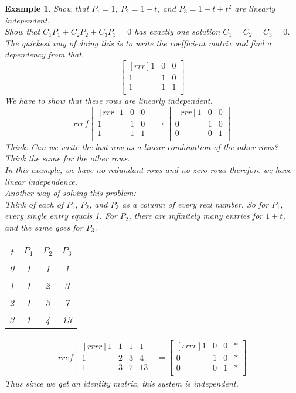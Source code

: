 \documentclass{report}
\newtheorem*{ex}{Example}
\begin{document}
\begin{ex}
Show that $P_1=1$, $P_2=1+t$, and $P_3=1+t+t^2$ are linearly independent.\\
Show that $C_1P_1+C_2P_2+C_3P_3=0$ has exactly one solution $C_1=C_2=C_3=0$.\\
The quickest way of doing this is to write the coefficient matrix and find a dependency from that.
\[ \begin{bmatrix}[rrr]1&0&0\\1&1&0\\1&1&1\\\end{bmatrix} \]
We have to show that these rows are linearly independent.\\
\[ rref\begin{bmatrix}[rrr]1&0&0\\1&1&0\\1&1&1\\\end{bmatrix} \rightarrow \begin{bmatrix}[rrr]1&0&0\\0&1&0\\0&0&1\\\end{bmatrix} \]
Think: Can we write the last row as a linear combination of the other rows? Think the same for the other rows.\\
In this example, we have no redundant rows and no zero rows therefore we have linear independence.\\
Another way of solving this problem:\\
Think of each of $P_1$, $P_2$, and $P_3$ as a column of every real number. So for $P_1$, every single entry equals 1. For $P_2$, there are infinitely many entries for $1+t$, and the same goes for $P_3$.\\
\begin{center}
\begin{tabular}{c|ccc}
t&$P_1$&$P_2$&$P_3$\\
0&1&1&1\\
1&1&2&3\\
2&1&3&7\\
3&1&4&13\\
\end{tabular}
\end{center}
\begin{align*}
rref\begin{bmatrix}[rrrr]1&1&1&1\\1&2&3&4\\1&3&7&13\\\end{bmatrix}
=\begin{bmatrix}[rrrr]1&0&0&*\\0&1&0&*\\0&0&1&*\\\end{bmatrix}
\end{align*}
Thus since we get an identity matrix, this system is independent.
\end{ex}
\end{document}
